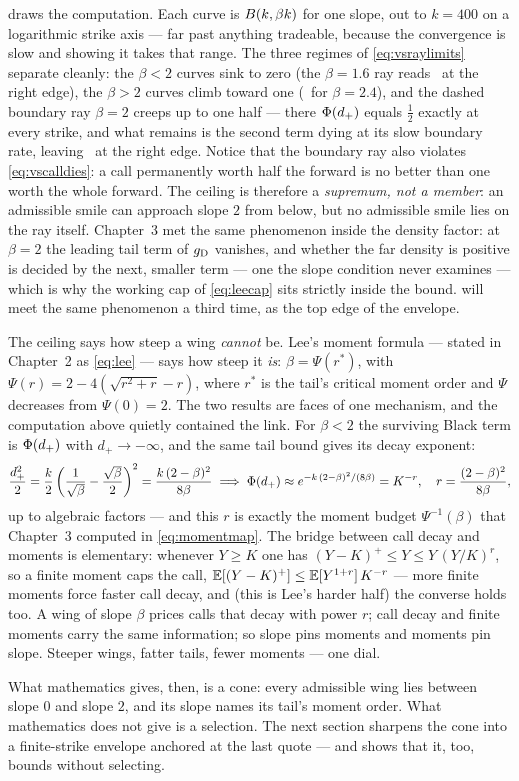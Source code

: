  draws the computation.  Each curve is
$B(k,\beta k)$ for one slope, out to $k=400$ on a logarithmic
strike axis --- far past anything tradeable, because the convergence
is slow and showing it takes that range.  The three regimes of
\eqref{eq:vsraylimits} separate cleanly: the $\beta<2$ curves sink to
zero (the $\beta=1.6$ ray reads \MacVsRayBelowLim\ at the right
edge), the $\beta>2$ curves climb toward one (\MacVsRayAboveLim\ for
$\beta=2.4$), and the dashed boundary ray $\beta=2$ creeps up to one
half --- there $\Phi(d_{+})$ equals $\tfrac12$ exactly at every
strike, and what remains is the second term dying at its slow
boundary rate, leaving \MacVsRayAtLim\ at the right edge.  Notice
that the boundary ray also violates
\eqref{eq:vscalldies}: a call permanently worth half the forward is no
better than one worth the whole forward.  The ceiling is therefore a
\emph{supremum, not a member}: an admissible smile can approach slope
$2$ from below, but no admissible smile lies on the ray itself.
Chapter~3 met the same phenomenon inside the density factor: at
$\beta=2$ the leading tail term of $g_{\rm D}$ vanishes, and whether
the far density is positive is decided by the next, smaller term ---
one the slope condition never examines --- which is why the working
cap of \cref{eq:leecap} sits strictly inside the bound.
 will meet the same phenomenon a third time, as
the top edge of the envelope.

The ceiling says how steep a wing \emph{cannot} be.  Lee's moment
formula --- stated in Chapter~2 as \cref{eq:lee} --- says how steep it
\emph{is}: $\beta=\Psi(r^{*})$, with
$\Psi(r)=2-4(\sqrt{r^{2}+r}-r)$, where $r^{*}$ is the tail's critical
moment order and $\Psi$ decreases from $\Psi(0)=2$.  The two results
are faces of one mechanism, and the computation above quietly
contained the link.  For $\beta<2$ the surviving Black term is
$\Phi(d_{+})$ with $d_{+}\to-\infty$, and the same tail bound gives
its decay exponent:
\[
\frac{d_{+}^{2}}{2}
=\frac{k}{2}\left(\frac{1}{\sqrt\beta}-\frac{\sqrt\beta}{2}\right)^{2}
=\frac{k\,(2-\beta)^{2}}{8\beta}
\;\Longrightarrow\;
\Phi(d_{+})\approx e^{-k\,(2-\beta)^{2}/(8\beta)}=K^{-r},
\quad
r=\frac{(2-\beta)^{2}}{8\beta},
\]
up to algebraic factors --- and this $r$ is exactly the moment budget
$\Psi^{-1}(\beta)$ that Chapter~3 computed in \cref{eq:momentmap}.
The bridge between call decay and moments is elementary: whenever
$Y\ge K$ one has $(Y-K)^{+}\le Y\le Y\,(Y/K)^{r}$, so a finite moment
caps the call, $\mathbb{E}[(Y-K)^{+}]\le\mathbb{E}[Y^{1+r}]\,K^{-r}$ --- more finite
moments force faster call decay, and (this is Lee's harder half) the
converse holds too.  A wing of slope
$\beta$ prices calls that decay with power $r$; call decay and finite
moments carry the same information; so slope pins moments and moments
pin slope.  Steeper wings, fatter tails, fewer moments --- one dial.

What mathematics gives, then, is a cone: every admissible wing lies
between slope $0$ and slope $2$, and its slope names its tail's moment
order.  What mathematics does not give is a selection.  The next
section sharpens the cone into a finite-strike envelope anchored at
the last quote --- and shows that it, too, bounds without selecting.
